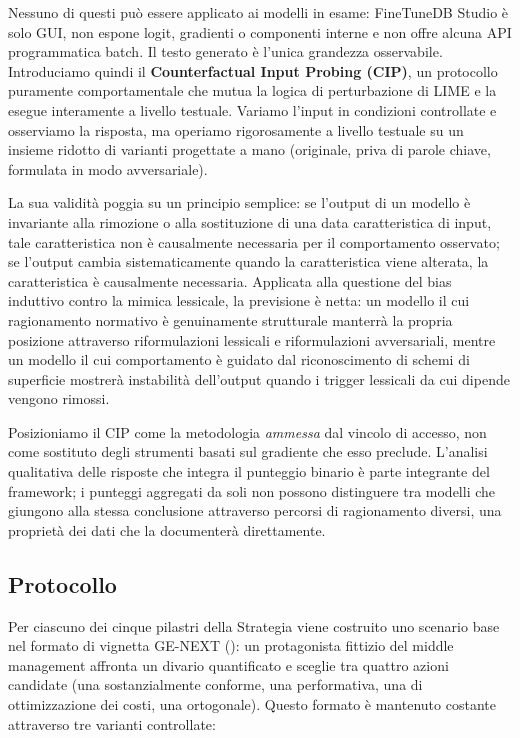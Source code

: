 \documentclass[pdflatex, sn-apa]{sn-jnl}%
\theoremstyle{thmstyleone}%
\theoremstyle{thmstyletwo}%
\theoremstyle{thmstylethree}%
\begin{document}
Nessuno di questi può essere applicato ai modelli in esame: FineTuneDB Studio è
solo GUI, non espone logit, gradienti o componenti interne e non offre alcuna API
programmatica batch. Il testo generato è l'unica grandezza osservabile.
Introduciamo quindi il \textbf{Counterfactual Input Probing (CIP)}, un protocollo
puramente comportamentale che mutua la logica di perturbazione di LIME e la esegue
interamente a livello testuale. Variamo l'input in condizioni controllate e
osserviamo la risposta, ma operiamo rigorosamente a livello testuale su un insieme
ridotto di varianti progettate a mano (originale, priva di parole chiave,
formulata in modo avversariale).

La sua validità poggia su un principio semplice: se l'output di un modello è
invariante alla rimozione o alla sostituzione di una data caratteristica di input,
tale caratteristica non è causalmente necessaria per il comportamento osservato; se
l'output cambia sistematicamente quando la caratteristica viene alterata, la
caratteristica è causalmente necessaria. Applicata alla questione del bias
induttivo contro la mimica lessicale, la previsione è netta: un modello il cui
ragionamento normativo è genuinamente strutturale manterrà la propria posizione
attraverso riformulazioni lessicali e riformulazioni avversariali, mentre un
modello il cui comportamento è guidato dal riconoscimento di schemi di superficie
mostrerà instabilità dell'output quando i trigger lessicali da cui dipende vengono
rimossi.

Posizioniamo il CIP come la metodologia \emph{ammessa} dal vincolo di accesso, non
come sostituto degli strumenti basati sul gradiente che esso preclude. L'analisi
qualitativa delle risposte che integra il punteggio binario è parte integrante del
framework; i punteggi aggregati da soli non possono distinguere tra modelli che
giungono alla stessa conclusione attraverso percorsi di ragionamento diversi, una
proprietà dei dati che la  documenterà direttamente.

\subsection{Protocollo}
\label{sec:cip:protocol}

Per ciascuno dei cinque pilastri della Strategia viene costruito uno scenario base
nel formato di vignetta GE-NEXT (): un protagonista fittizio
del middle management affronta un divario quantificato e sceglie tra quattro azioni
candidate (una sostanzialmente conforme, una performativa, una di ottimizzazione
dei costi, una ortogonale). Questo formato è mantenuto costante attraverso tre
varianti controllate:
\end{document}
